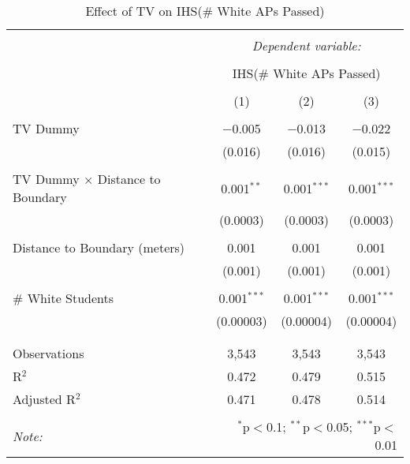 
\begin{table}[!htbp] \centering 
  \caption{Effect of TV on IHS(\# White APs Passed)} 
  \label{} 
\begin{tabular}{@{\extracolsep{-2pt}}lccc} 
\\[-1.8ex]\hline 
\hline \\[-1.8ex] 
 & \multicolumn{3}{c}{\textit{Dependent variable:}} \\ 
\cline{2-4} 
\\[-1.8ex] & \multicolumn{3}{c}{IHS(\# White APs Passed)} \\ 
\\[-1.8ex] & (1) & (2) & (3)\\ 
\hline \\[-1.8ex] 
 TV Dummy & $-$0.005 & $-$0.013 & $-$0.022 \\ 
  & (0.016) & (0.016) & (0.015) \\ 
  & & & \\ 
 TV Dummy $\times$ Distance to Boundary & 0.001$^{**}$ & 0.001$^{***}$ & 0.001$^{***}$ \\ 
  & (0.0003) & (0.0003) & (0.0003) \\ 
  & & & \\ 
 Distance to Boundary (meters) & 0.001 & 0.001 & 0.001 \\ 
  & (0.001) & (0.001) & (0.001) \\ 
  & & & \\ 
 \# White Students & 0.001$^{***}$ & 0.001$^{***}$ & 0.001$^{***}$ \\ 
  & (0.00003) & (0.00004) & (0.00004) \\ 
  & & & \\ 
\hline \\[-1.8ex] 
Observations & 3,543 & 3,543 & 3,543 \\ 
R$^{2}$ & 0.472 & 0.479 & 0.515 \\ 
Adjusted R$^{2}$ & 0.471 & 0.478 & 0.514 \\ 
\hline 
\hline \\[-1.8ex] 
\textit{Note:}  & \multicolumn{3}{r}{$^{*}$p$<$0.1; $^{**}$p$<$0.05; $^{***}$p$<$0.01} \\ 
\end{tabular} 
\end{table} 
